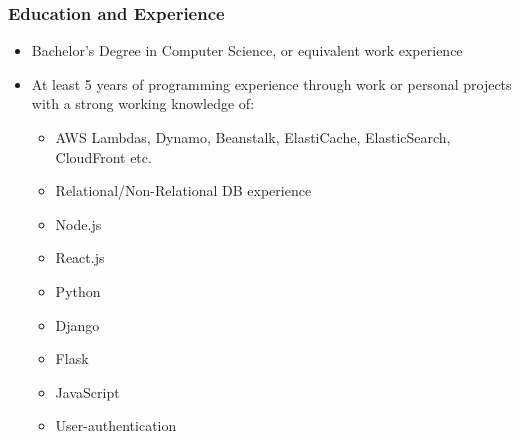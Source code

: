 \subsubsection{Education and Experience}
\begin{itemize}
    \item Bachelor’s Degree in Computer Science, or equivalent work experience
    \item At least 5 years of programming experience through work or personal projects with a strong working knowledge of:
        \begin{itemize}
        \item AWS Lambdas, Dynamo, Beanstalk, ElastiCache, ElasticSearch, CloudFront etc.
        \item Relational/Non-Relational DB experience
        \item Node.js
        \item React.js
        \item Python
        \item Django
        \item Flask
        \item JavaScript
        \item User-authentication
        \end{itemize}
\end{itemize}